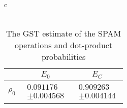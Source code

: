 \documentclass{beamer}
\begin{document}
\begin{frame}
\begin{table}[h]
\begin{center}
{\begin{tabular}{c}
\\
\vspace{2em}
\\
\begin{tabular}[l]{|c|c|c|}
\hline
 & $E_{0}$ & $E_C$ \\ \hline
$\rho_{0}$ & $ \begin{array}{c} 0.091176 \\ \pm 0.004568 \end{array} $ & $ \begin{array}{c} 0.909263 \\ \pm 0.004144 \end{array} $ \\ \hline
\end{tabular}

\end{tabular}
}
\caption{The GST estimate of the SPAM operations and dot-product probabilities}
\end{center}
\end{table}

\end{frame}
\end{document}
